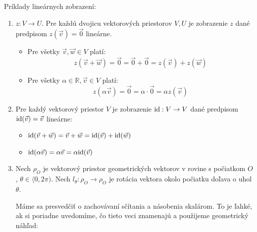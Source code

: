 \begin{priklad}
Príklady lineárnych zobrazení:
\begin{enumerate}
    \item $z: V \to U$. Pre každú dvojicu vektorových priestorov $V, U$ je zobrazenie $z$ dané predpisom $z(\vec{v}) = \vec{0}$ lineárne.
    \begin{itemize}
        \item Pre všetky $\vec{v}, \vec{w} \in V$ platí:
        $$ z(\vec{v} + \vec{w}) = \vec{0} = \vec{0} + \vec{0} = z(\vec{v}) + z(\vec{w}) $$
        \item Pre všetky $\alpha \in \mathbb{R}, \vec{v} \in V$ platí:
        $$ z(\alpha \vec{v}) = \vec{0} = \alpha \cdot \vec{0} = \alpha z(\vec{v}) $$
    \end{itemize}
    
    \item Pre každý vektorový priestor $V$ je zobrazenie $\mathrm{id}: V \to V$ dané predpisom $\mathrm{id}(\vec{v}) = \vec{v}$ lineárne:
    \begin{itemize}
        \item $\mathrm{id}(\vec{v} + \vec{w}) = \vec{v} + \vec{w} = \mathrm{id}(\vec{v}) + \mathrm{id}(\vec{w})$
        \item $\mathrm{id}(\alpha \vec{v}) = \alpha \vec{v} = \alpha \mathrm{id}(\vec{v})$
    \end{itemize}
    
    \item Nech $\rho_O$ je vektorový priestor geometrických vektorov v rovine s
    počiatkom $O$, $\theta \in \langle 0, 2\pi)$. Nech $l_\theta: \rho_O \to \rho_O$ je rotácia vektora okolo počiatku doľava o uhol $\theta$.
    
    Máme sa presvedčiť o zachovávaní sčítania a násobenia skalárom. To je ľahké, ak si poriadne uvedomíme, čo tieto veci znamenajú a použijeme geometrický náhľad:
\begin{figure}
\begin{center}
\end{center}
\end{figure}
\end{enumerate}
\end{priklad}
